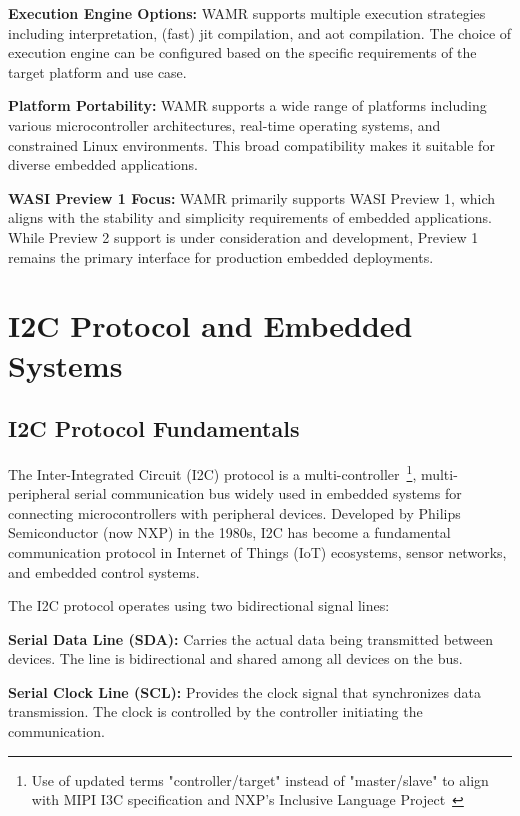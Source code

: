 \textbf{Execution Engine Options:} WAMR supports multiple execution strategies including interpretation, (fast) \acrshort{jit} compilation, and \acrshort{aot} compilation. The choice of execution engine can be configured based on the specific requirements of the target platform and use case.

\textbf{Platform Portability:} WAMR supports a wide range of platforms including various microcontroller architectures, real-time operating systems, and constrained Linux environments. This broad compatibility makes it suitable for diverse embedded applications.

\textbf{WASI Preview 1 Focus:} WAMR primarily supports WASI Preview 1, which aligns with the stability and simplicity requirements of embedded applications. While Preview 2 support is under consideration and development, Preview 1 remains the primary interface for production embedded deployments.

\section{I2C Protocol and Embedded Systems}
\label{sec:i2c-embedded}

\subsection{I2C Protocol Fundamentals}
\label{subsec:i2c-fundamentals}

The Inter-Integrated Circuit (I2C) protocol is a multi-controller~\footnote{Use of updated terms "controller/target" instead of "master/slave" to align with MIPI I3C
specification and NXP's Inclusive Language Project~\cite{i2c_specification}}, multi-peripheral serial communication bus widely used in embedded systems for connecting microcontrollers with peripheral devices\cite{i2c_specification}. Developed by Philips Semiconductor (now NXP) in the 1980s, I2C has become a fundamental communication protocol in Internet of Things (IoT) ecosystems, sensor networks, and embedded control systems.

The I2C protocol operates using two bidirectional signal lines:

\textbf{Serial Data Line (SDA):} Carries the actual data being transmitted between devices. The line is bidirectional and shared among all devices on the bus.

\textbf{Serial Clock Line (SCL):} Provides the clock signal that synchronizes data transmission. The clock is controlled by the controller initiating the communication.

